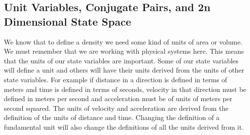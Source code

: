 \documentclass{article}[a4paper]
\begin{document}
\subsection{Unit Variables, Conjugate Pairs, and 2n Dimensional State Space}

	We know that to define a density we need some kind of units of area or volume. We must remember that we are working with physical systems here. This means that the units of our state variables are important. Some of our state variables will define a unit and others will have their units derived from the units of other state variables. For example if distance in a direction is defined in terms of meters and time is defined in terms of seconds, velocity in that direction must be defined in meters per second and acceleration must be of units of meters per second squared. The units of velocity and acceleration are derived from the definition of the units of distance and time. Changing the definition of a fundamental unit will also change the definitions of all the units derived from it. 
	
\end{document}
